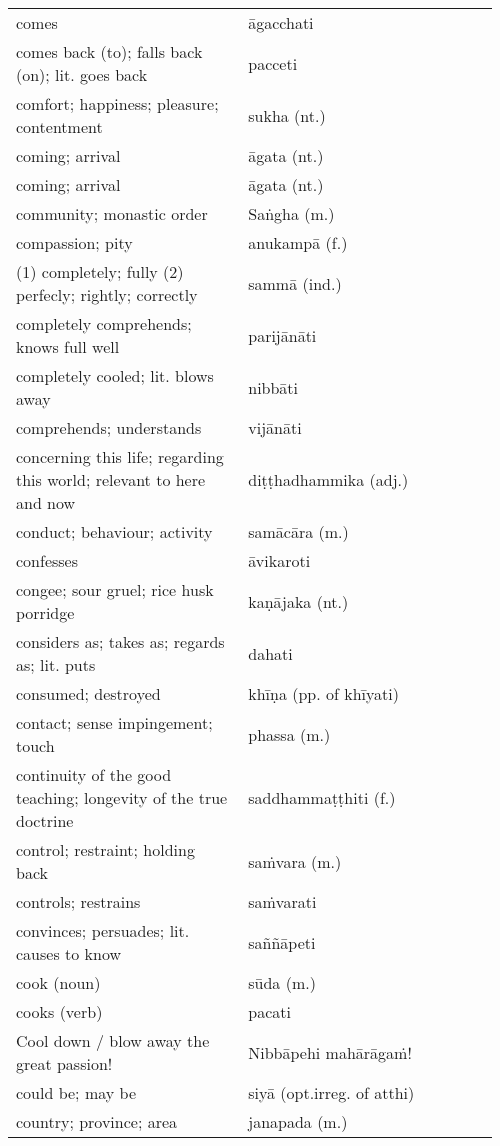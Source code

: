 \documentclass[a5paper]{memoir}
\begin{document}
\begin{longtable}{L{0.48\linewidth} L{0.48\linewidth} H}
comes & āgacchati & \\[0pt]
comes back (to); falls back (on); lit. goes back & pacceti & \\[0pt]
comfort; happiness; pleasure; contentment & sukha (nt.) & \\[0pt]
coming; arrival & āgata (nt.) & \\[0pt]
coming; arrival & āgata (nt.) & \\[0pt]
community; monastic order & Saṅgha (m.) & \\[0pt]
compassion; pity & anukampā (f.) & \\[0pt]
(1) completely; fully (2) perfecly; rightly; correctly & sammā (ind.) & \\[0pt]
completely comprehends; knows full well & parijānāti & \\[0pt]
completely cooled; lit. blows away & nibbāti & \\[0pt]
comprehends; understands & vijānāti & \\[0pt]
concerning this life; regarding this world; relevant to here and now & diṭṭhadhammika (adj.) & \\[0pt]
conduct; behaviour; activity & samācāra (m.) & \\[0pt]
confesses & āvikaroti & \\[0pt]
congee; sour gruel; rice husk porridge & kaṇājaka (nt.) & \\[0pt]
considers as; takes as; regards as; lit. puts & dahati & \\[0pt]
consumed; destroyed & khīṇa (pp. of khīyati) & \\[0pt]
contact; sense impingement; touch & phassa (m.) & \\[0pt]
continuity of the good teaching; longevity of the true doctrine & saddhammaṭṭhiti (f.) & \\[0pt]
control; restraint; holding back & saṁvara (m.) & \\[0pt]
controls; restrains & saṁvarati & \\[0pt]
convinces; persuades; lit. causes to know & saññāpeti & \\[0pt]
cook (noun) & sūda (m.) & \\[0pt]
cooks (verb) & pacati & \\[0pt]
Cool down / blow away the great passion! & Nibbāpehi mahārāgaṁ! & \\[0pt]
could be; may be & siyā (opt.irreg. of atthi) & \\[0pt]
country; province; area & janapada (m.) & \\[0pt]

\end{longtable}
\end{document}
